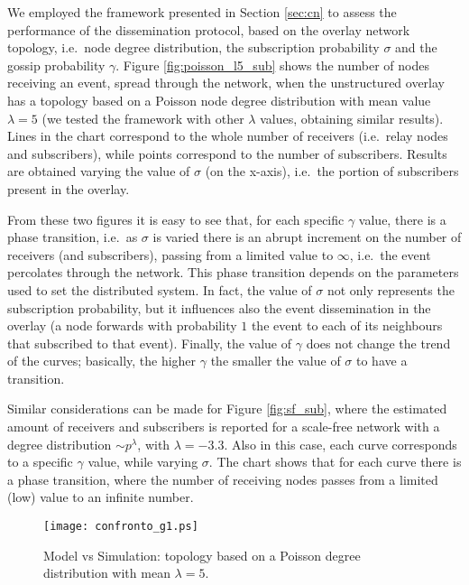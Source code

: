 \documentclass[10pt, conference, compsocconf]{IEEEtran}
\begin{document}
We employed the framework presented in Section \ref{sec:cn} to assess the performance of the dissemination protocol, based on the overlay network topology, i.e.~node degree distribution, the subscription probability $\sigma$ and the gossip probability $\gamma$. 
Figure \ref{fig:poisson_l5_sub} shows the number of nodes receiving an event, spread through the network, when the unstructured overlay has a topology based on a Poisson node degree distribution with mean value $\lambda=5$ (we tested the framework with other $\lambda$ values, obtaining similar results). 
Lines in the chart correspond to the whole number of receivers (i.e.~relay nodes and subscribers), while points correspond to the number of subscribers.
Results are obtained varying the value of $\sigma$ (on the x-axis), i.e.~the portion of subscribers present in the overlay.

From these two figures it is easy to see that, for each specific $\gamma$ value, there is a phase transition, i.e.~as $\sigma$ is varied there is an abrupt increment on the number of receivers (and subscribers), passing from a limited value to $\infty$, i.e.~the event percolates through the network. 
This phase transition depends on the parameters used to set the distributed system. In fact, the value of $\sigma$ not only represents the subscription probability, but it influences also the event dissemination in the overlay (a node forwards with probability $1$ the event to each of its neighbours that subscribed to that event).
Finally, the value of $\gamma$ does not change the trend of the curves; basically, the higher $\gamma$ the smaller the value of $\sigma$ to have a transition. 

Similar considerations can be made for Figure \ref{fig:sf_sub}, where the estimated amount of receivers and subscribers is reported for a scale-free network with a degree distribution $\sim p^\lambda$, with $\lambda = -3.3$. Also in this case, each curve corresponds to a specific $\gamma$ value, while varying $\sigma$. The chart shows that for each curve there is a phase transition, where the number of receiving nodes passes from a limited (low) value to an infinite number.



\begin{figure}[t]
   \centering
   \texttt{[image: confronto\_g1.ps]}
   \caption{Model vs Simulation: topology based on a Poisson degree distribution with mean $\lambda = 5$.}
   \label{fig:confronto_g1}
\end{figure}
\end{document}

